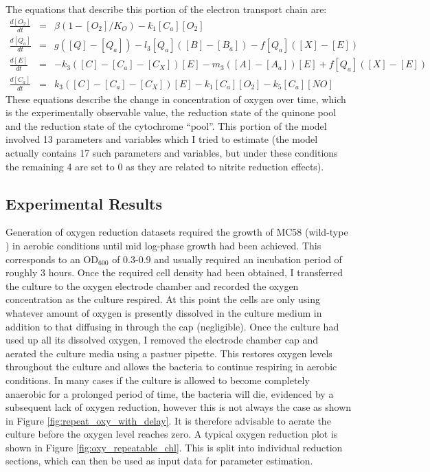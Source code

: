The equations that describe this portion of the electron transport chain are:
\begin{eqnarray*}
\frac{d[O_2]}{dt} & = & \beta(1-[O_2]/K_O) - k_{1}[C_a][O_2]\\
\frac{d[Q_a]}{dt} & = & g([Q] - [Q_a]) - l_3[Q_a]([B] - [B_a]) - f[Q_a]([X]-[E])\\
\frac{d[E]}{dt} & = & -k_3([C] - [C_a] - [C_X])[E]  - m_3([A] - [A_a])[E] + f[Q_a]([X]-[E])\\
\frac{d[C_a]}{dt} & = & k_3([C] - [C_a] - [C_X])[E] - k_{1}[C_a][O_2] - k_5[C_a][NO]
\end{eqnarray*}
These equations describe the change in concentration of oxygen over time, which is the experimentally observable value, the reduction state of the quinone pool and the reduction state of the cytochrome ``pool''. This portion of the model involved 13 parameters and variables which I tried to estimate (the model actually contains 17 such parameters and variables, but under these conditions the remaining 4 are set to 0 as they are related to nitrite reduction effects).

\subsection{Experimental Results}

Generation of oxygen reduction datasets required the growth of MC58 (wild-type \Nsm{}) in aerobic conditions until mid log-phase growth had been achieved. This corresponds to an $\mathrm{OD}_{600}$ of 0.3-0.9 and usually required an incubation period of roughly 3 hours. Once the required cell density had been obtained, I transferred the culture to the oxygen electrode chamber and recorded the oxygen concentration as the culture respired. At this point the cells are only using whatever amount of oxygen is presently dissolved in the culture medium in addition to that diffusing in through the cap (negligible). Once the culture had used up all its dissolved oxygen, I removed the electrode chamber cap and aerated the culture media using a pastuer pipette. This restores oxygen levels throughout the culture and allows the bacteria to continue respiring in aerobic conditions. In many cases if the culture is allowed to become completely anaerobic for a prolonged period of time, the bacteria will die, evidenced by a subsequent lack of oxygen reduction, however this is not always the case as shown in Figure \ref{fig:repeat_oxy_with_delay}. It is therefore advisable to aerate the culture before the oxygen level reaches zero. A typical oxygen reduction plot is shown in Figure \ref{fig:oxy_repeatable_chl}. This is split into individual reduction sections, which can then be used as input data for parameter estimation.


